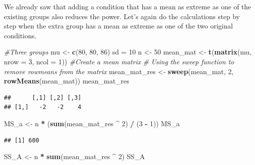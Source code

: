 \documentclass[
]{book}
\newenvironment{Shaded}{\begin{snugshade}}{\end{snugshade}}
\newcommand{\CommentTok}[1]{\textcolor[rgb]{0.56,0.35,0.01}{\textit{#1}}}
\newcommand{\DataTypeTok}[1]{\textcolor[rgb]{0.13,0.29,0.53}{#1}}
\newcommand{\DecValTok}[1]{\textcolor[rgb]{0.00,0.00,0.81}{#1}}
\newcommand{\KeywordTok}[1]{\textcolor[rgb]{0.13,0.29,0.53}{\textbf{#1}}}
\newcommand{\NormalTok}[1]{#1}
\newcommand{\OperatorTok}[1]{\textcolor[rgb]{0.81,0.36,0.00}{\textbf{#1}}}
\newcommand{\StringTok}[1]{\textcolor[rgb]{0.31,0.60,0.02}{#1}}
\begin{document}
We already saw that adding a condition that has a mean as extreme as one of the existing groups also reduces the power. Let's again do the calculations step by step when the extra group has a mean as extreme as one of the two original conditions.

\begin{Shaded}
\begin{Highlighting}[]
\CommentTok{#Three groups}
\NormalTok{mu <-}\StringTok{ }\KeywordTok{c}\NormalTok{(}\DecValTok{80}\NormalTok{, }\DecValTok{80}\NormalTok{, }\DecValTok{86}\NormalTok{)}
\NormalTok{sd =}\StringTok{ }\DecValTok{10}
\NormalTok{n <-}\StringTok{ }\DecValTok{50}
\NormalTok{mean_mat <-}\StringTok{ }\KeywordTok{t}\NormalTok{(}\KeywordTok{matrix}\NormalTok{(mu,}
\DataTypeTok{nrow =} \DecValTok{3}\NormalTok{,}
\DataTypeTok{ncol =} \DecValTok{1}\NormalTok{)) }\CommentTok{#Create a mean matrix}
\CommentTok{# Using the sweep function to remove rowmeans from the matrix}
\NormalTok{mean_mat_res <-}\StringTok{ }\KeywordTok{sweep}\NormalTok{(mean_mat, }\DecValTok{2}\NormalTok{, }\KeywordTok{rowMeans}\NormalTok{(mean_mat))}
\NormalTok{mean_mat_res}
\end{Highlighting}
\end{Shaded}

\begin{verbatim}
##      [,1] [,2] [,3]
## [1,]   -2   -2    4
\end{verbatim}

\begin{Shaded}
\begin{Highlighting}[]
\NormalTok{MS_a <-}\StringTok{ }\NormalTok{n }\OperatorTok{*}\StringTok{ }\NormalTok{(}\KeywordTok{sum}\NormalTok{(mean_mat_res }\OperatorTok{^}\StringTok{ }\DecValTok{2}\NormalTok{) }\OperatorTok{/}\StringTok{ }\NormalTok{(}\DecValTok{3} \OperatorTok{-}\StringTok{ }\DecValTok{1}\NormalTok{))}
\NormalTok{MS_a}
\end{Highlighting}
\end{Shaded}

\begin{verbatim}
## [1] 600
\end{verbatim}

\begin{Shaded}
\begin{Highlighting}[]
\NormalTok{SS_A <-}\StringTok{ }\NormalTok{n }\OperatorTok{*}\StringTok{ }\KeywordTok{sum}\NormalTok{(mean_mat_res }\OperatorTok{^}\StringTok{ }\DecValTok{2}\NormalTok{)}
\NormalTok{SS_A}
\end{Highlighting}
\end{Shaded}
\end{document}
